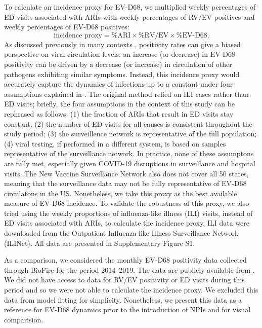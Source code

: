 \documentclass[12pt]{article}
\begin{document}
To calculate an incidence proxy for EV-D68, we multiplied weekly percentages of ED visits associated with ARIs with weekly percentages of RV/EV positives and weekly percentages of EV-D68 positives:
\begin{equation}
\textrm{incidence proxy} = \textrm{\% ARI} \times \textrm{\% RV/EV} \times \textrm{\% EV-D68}.
\end{equation}
As discussed previously in many contexts \citep{goldstein2011predicting,kissler2020projecting}, positivity rates can give a biased perspective on viral circulation levels: an increase (or decrease) in EV-D68 positivity can be driven by a decrease (or increase) in circulation of other pathogens exhibiting similar symptoms.
Instead, this incidence proxy would accurately capture the dynamics of infections up to a constant under four assumptions explained in \citep{goldstein2011predicting}.
The original method relied on ILI cases rather than ED visits; briefly, the four assumptions in the context of this study can be rephrased as follows:
(1) the fraction of ARIs that result in ED visits stay constant;
(2) the number of ED visits for all causes is consistent throughout the study period;
(3) the surveillence network is representative of the full population;
(4) viral testing, if performed in a different system, is based on samples representative of the surveillance network.
In practice, none of these assumptons are fully met, especially given COVID-19 disruptions in surveillance and hospital visits.
The New Vaccine Surveillance Network also does not cover all 50 states, meaning that the surveillance data may not be fully representative of EV-D68 circulatons in the US.
Nonetheless, we take this proxy as the best available measure of EV-D68 incidence.
To validate the robustness of this proxy, we also tried using the weekly proportions of influenza-like illness (ILI) visits, instead of ED visits  associated with ARIs, to calculate the incidence proxy.
ILI data were downloaded from the Outpatient Influenza-like Illness Surveillance Network (ILINet).
All data are presented in Supplementary Figure S1.

As a comparison, we considered the monthly EV-D68 positivity data collected through BioFire for the period 2014--2019.
The data are publicly available from \cite{park2021epidemiological}.
We did not have access to data for RV/EV positivity or ED visits during this period and so we were not able to calculate the incidence proxy.
We excluded this data from model fitting for simplicity.
Nonetheless, we present this data as a reference for EV-D68 dynamics prior to the introduction of NPIs and for visual comparision.
\end{document}
